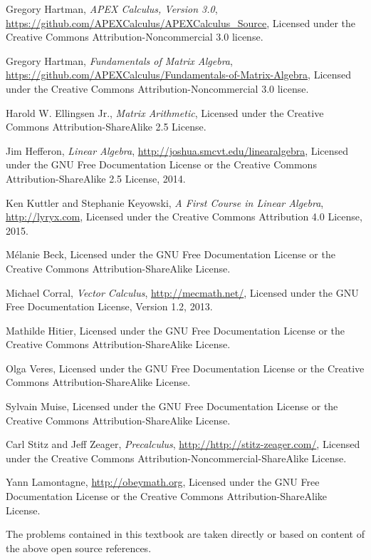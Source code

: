 \onecolumn


\begin{thebibliography}{9}
Gregory Hartman,
\emph{APEX Calculus, Version 3.0},
\url{https://github.com/APEXCalculus/APEXCalculus_Source},
Licensed under the
Creative Commons Attribution-Noncommercial 3.0 license.

Gregory Hartman,
\emph{Fundamentals of Matrix Algebra},
\url{https://github.com/APEXCalculus/Fundamentals-of-Matrix-Algebra},
Licensed under the 
Creative Commons Attribution-Noncommercial 3.0 license.

Harold W. Ellingsen Jr.,
\emph{Matrix Arithmetic},
Licensed under the
Creative Commons Attribution-ShareAlike 2.5 License.
 

Jim Hefferon,
\emph{Linear Algebra},
\url{http://joshua.smcvt.edu/linearalgebra},
Licensed under the GNU Free Documentation License or the 
Creative Commons Attribution-ShareAlike 2.5 License,
2014.

Ken Kuttler and Stephanie Keyowski,
\emph{A First Course in Linear Algebra},
\url{http://lyryx.com},
Licensed under the
Creative Commons Attribution 4.0 License,
2015.

M\'elanie Beck,
Licensed under the GNU Free Documentation License or the
Creative Commons Attribution-ShareAlike License.


Michael Corral,
\emph{Vector Calculus},
\url{http://mecmath.net/},
Licensed under the GNU Free Documentation License, Version 1.2, 2013.

Mathilde Hitier,
Licensed under the GNU Free Documentation License or the
Creative Commons Attribution-ShareAlike License.

Olga Veres,
Licensed under the GNU Free Documentation License or the
Creative Commons Attribution-ShareAlike License.

Sylvain Muise,
Licensed under the GNU Free Documentation License or the
Creative Commons Attribution-ShareAlike License.

Carl Stitz and Jeff Zeager,
\emph{Precalculus},
\url{http://http://stitz-zeager.com/},
Licensed under the
Creative Commons Attribution-Noncommercial-ShareAlike License.

Yann Lamontagne,
\url{http://obeymath.org},
Licensed under the GNU Free Documentation License or the 
Creative Commons Attribution-ShareAlike License.

\end{thebibliography}
The problems contained in this textbook are taken directly or based on content of the above open source references.


